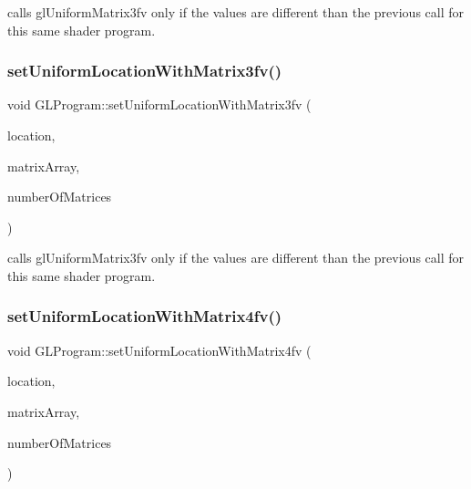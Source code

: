 calls gl\+Uniform\+Matrix3fv only if the values are different than the previous call for this same shader program. \mbox{\label{classGLProgram_a9a9ffe60dcf17ff4fa75d838117f4e93}} 
\subsubsection{\texorpdfstring{set\+Uniform\+Location\+With\+Matrix3fv()}{setUniformLocationWithMatrix3fv()}\hspace{0.1cm}{\footnotesize\ttfamily [2/2]}}
{\footnotesize\ttfamily void G\+L\+Program\+::set\+Uniform\+Location\+With\+Matrix3fv (\begin{DoxyParamCaption}\item[{G\+Lint}]{location,  }\item[{const G\+Lfloat $\ast$}]{matrix\+Array,  }\item[{unsigned int}]{number\+Of\+Matrices }\end{DoxyParamCaption})}

calls gl\+Uniform\+Matrix3fv only if the values are different than the previous call for this same shader program. \mbox{\label{classGLProgram_a3b6a91383721692fe73f316454325fd7}} 
\subsubsection{\texorpdfstring{set\+Uniform\+Location\+With\+Matrix4fv()}{setUniformLocationWithMatrix4fv()}\hspace{0.1cm}{\footnotesize\ttfamily [1/2]}}
{\footnotesize\ttfamily void G\+L\+Program\+::set\+Uniform\+Location\+With\+Matrix4fv (\begin{DoxyParamCaption}\item[{G\+Lint}]{location,  }\item[{const G\+Lfloat $\ast$}]{matrix\+Array,  }\item[{unsigned int}]{number\+Of\+Matrices }\end{DoxyParamCaption})}

